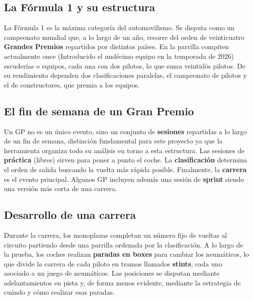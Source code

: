 \documentclass[12pt,a4paper,twoside,openright]{book}
\begin{document}
\subsection{La Fórmula 1 y su estructura}
La Fórmula 1 es la máxima categoría del automovilismo. Se disputa como un campeonato mundial que, a lo largo de un año, recorre del orden de veinticuatro \textbf{Grandes Premios} repartidos por distintos países. 
En la parrilla compiten actualmente once (Introducido el undécimo equipo en la temporada de 2026) escuderías o equipos, cada una con dos pilotos, lo que suma veintidós pilotos. De su rendimiento dependen dos clasificaciones paralelas, el campeonato de pilotos y el de constructores, que premia a los equipos.

\subsection{El fin de semana de un Gran Premio}
Un GP no es un único evento, sino un conjunto de \textbf{sesiones} repartidas a lo largo de un fin de semana, distinción fundamental para este proyecto ya que la herramienta organiza todo su análisis en torno a esta estructura.
Las sesiones de \textbf{práctica} (libres) sirven para poner a punto el coche. La \textbf{clasificación} determina el orden de salida buscando la vuelta más rápida posible. Finalmente, la \textbf{carrera} es el evento principal. Algunos GP incluyen además una sesión de \textbf{sprint} siendo una versión más corta de una carrera.

\subsection{Desarrollo de una carrera}
Durante la carrera, los monoplazas completan un número fijo de vueltas al circuito partiendo desde una parrilla ordenada por la clasificación. A lo largo de la prueba, los coches realizan \textbf{paradas en boxes} para cambiar los neumáticos, lo que divide la carrera de cada piloto en tramos llamados \textbf{stints}, cada uno asociado a un juego de neumáticos.
Las posiciones se disputan mediante adelantamientos en pista y, de forma menos evidente, mediante la estrategia de cuándo y cómo realizar esas paradas.
\end{document}
